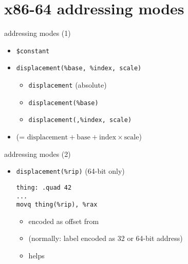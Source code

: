\section{x86-64 addressing modes}

\begin{frame}[fragile,label=addressing1]{addressing modes (1)}
    \begin{itemize}
        \item {\tt \$constant}
        \item {\tt displacement(\%base, \%index, scale)}
            \begin{itemize}
            \item {\tt displacement} (absolute)
            \item {\tt displacement(\%base)}
            \item {\tt displacement(,\%index, scale)}
            \end{itemize}
        \item (= $\text{displacement} + \text{base} + \text{index} \times \text{scale}$)
    \end{itemize}
\end{frame}

\begin{frame}[fragile,label=addressing2]{addressing modes (2)}
    \begin{itemize}
        \item {\tt displacement(\%rip)} (64-bit only)
\begin{lstlisting}
thing: .quad 42
...
movq thing(%rip), %rax
\end{lstlisting}
        \begin{itemize}
        \item encoded as offset from 
        \item (normally: label encoded as 32 or 64-bit address)
        \item helps 
        \end{itemize}
    \end{itemize}
\end{frame}

